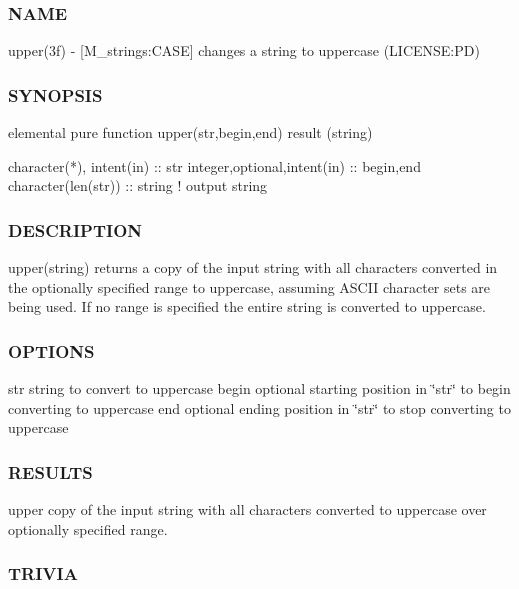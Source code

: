\subsubsection*{N\+A\+ME}

upper(3f) -\/ \mbox{[}M\+\_\+strings\+:C\+A\+SE\mbox{]} changes a string to uppercase (L\+I\+C\+E\+N\+SE\+:PD) 

\subsubsection*{S\+Y\+N\+O\+P\+S\+IS}

\begin{DoxyVerb}elemental pure function upper(str,begin,end) result (string)

 character(*), intent(in)    :: str
 integer,optional,intent(in) :: begin,end
 character(len(str))         :: string  ! output string
\end{DoxyVerb}
 \subsubsection*{D\+E\+S\+C\+R\+I\+P\+T\+I\+ON}

upper(string) returns a copy of the input string with all characters converted in the optionally specified range to uppercase, assuming A\+S\+C\+II character sets are being used. If no range is specified the entire string is converted to uppercase.

\subsubsection*{O\+P\+T\+I\+O\+NS}

str string to convert to uppercase begin optional starting position in \char`\"{}str\char`\"{} to begin converting to uppercase end optional ending position in \char`\"{}str\char`\"{} to stop converting to uppercase

\subsubsection*{R\+E\+S\+U\+L\+TS}

upper copy of the input string with all characters converted to uppercase over optionally specified range.

\subsubsection*{T\+R\+I\+V\+IA}

